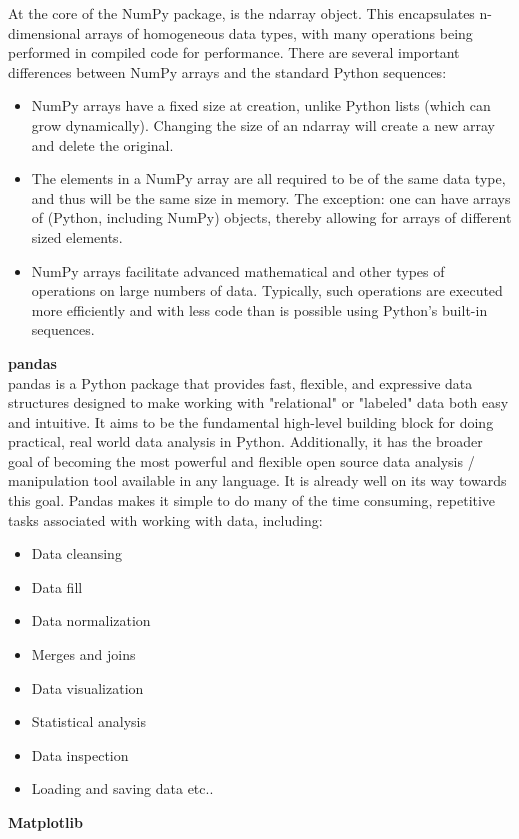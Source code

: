 \documentclass[12pt]{article}
\begin{document}
At the core of the NumPy package, is the ndarray object. This encapsulates n-dimensional arrays of homogeneous data types, with many operations being performed in compiled code for performance. There are several important differences between NumPy arrays and the standard Python sequences:
\begin{itemize}
\item NumPy arrays have a fixed size at creation, unlike Python lists (which can grow dynamically). Changing the size of an ndarray will create a new array and delete the original.
\item The elements in a NumPy array are all required to be of the same data type, and thus will be the same size in memory. The exception: one can have arrays of (Python, including NumPy) objects, thereby allowing for arrays of different sized elements.
\item NumPy arrays facilitate advanced mathematical and other types of operations on large numbers of data. Typically, such operations are executed more efficiently and with less code than is possible using Python’s built-in sequences.
\end{itemize}
\textbf{pandas}
\\
pandas is a Python package that provides fast, flexible, and expressive data structures designed to make working with "relational" or "labeled" data both easy and intuitive. It aims to be the fundamental high-level building block for doing practical, real world data analysis in Python. Additionally, it has the broader goal of becoming the most powerful and flexible open source data analysis / manipulation tool available in any language. It is already well on its way towards this goal.
Pandas makes it simple to do many of the time consuming, repetitive tasks associated with working with data, including:
\begin{itemize}
\item Data cleansing
\item Data fill
\item Data normalization
\item Merges and joins
\item Data visualization
\item Statistical analysis
\item Data inspection
\item Loading and saving data etc..
\end{itemize}

\textbf{Matplotlib}
\end{document}
